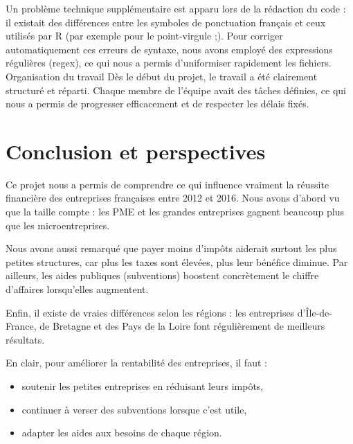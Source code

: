 \documentclass[mstat,12pt]{unswthesis}
\begin{document}
\medskip

Un problème technique supplémentaire est apparu lors de la rédaction du
code : il existait des différences entre les symboles de ponctuation
français et ceux utilisés par R (par exemple pour le point-virgule ;).
Pour corriger automatiquement ces erreurs de syntaxe, nous avons employé
des expressions régulières (regex), ce qui nous a permis d'uniformiser
rapidement les fichiers. Organisation du travail \medskip Dès le début
du projet, le travail a été clairement structuré et réparti. Chaque
membre de l'équipe avait des tâches définies, ce qui nous a permis de
progresser efficacement et de respecter les délais fixés.

\chapter{Conclusion et perspectives}\label{conclusion-et-perspectives}

\medskip

Ce projet nous a permis de comprendre ce qui influence vraiment la
réussite financière des entreprises françaises entre 2012 et 2016. Nous
avons d'abord vu que la taille compte : les PME et les grandes
entreprises gagnent beaucoup plus que les microentreprises.

\medskip

Nous avons aussi remarqué que payer moins d'impôts aiderait surtout les
plus petites structures, car plus les taxes sont élevées, plus leur
bénéfice diminue. Par ailleurs, les aides publiques (subventions)
boostent concrètement le chiffre d'affaires lorsqu'elles augmentent.

\medskip

Enfin, il existe de vraies différences selon les régions : les
entreprises d'Île-de-France, de Bretagne et des Pays de la Loire font
régulièrement de meilleurs résultats.

\medskip

En clair, pour améliorer la rentabilité des entreprises, il faut :

\begin{itemize}
\item
  soutenir les petites entreprises en réduisant leurs impôts,
\item
  continuer à verser des subventions lorsque c'est utile,
\item
  adapter les aides aux besoins de chaque région.
\end{itemize}

\medskip
\end{document}
